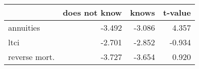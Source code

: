 \begin{tabular}{lrrr}
\toprule
{} &  does not know &  knows &  t-value \\
\midrule
annuities     &         -3.492 & -3.086 &    4.357 \\
ltci          &         -2.701 & -2.852 &   -0.934 \\
reverse mort. &         -3.727 & -3.654 &    0.920 \\
\bottomrule
\end{tabular}
